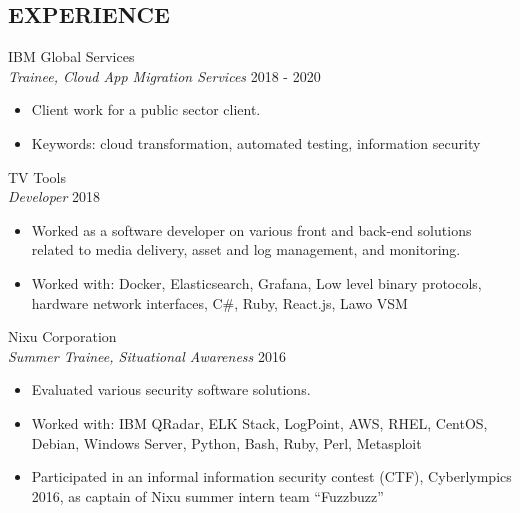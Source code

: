 \documentclass[margin, 10pt]{res} %
\begin{document}
\begin{resume}

%
%

 
\section{EXPERIENCE}
  
IBM Global Services\\
{\sl Trainee, Cloud App Migration Services} \hfill 2018 - 2020
\begin{itemize} \itemsep -2pt %
\item Client work for a public sector client.
\item Keywords: cloud transformation, automated testing, information security
\end{itemize}

\addvspace{-7pt}
TV Tools\\
{\sl Developer} \hfill 2018
\begin{itemize} \itemsep -2pt %
\item Worked as a software developer on various front and back-end solutions related to media delivery, asset and log management, and monitoring.
\item Worked with: Docker, Elasticsearch, Grafana, Low level binary protocols, hardware network interfaces, C\#, Ruby, React.js, Lawo VSM
\end{itemize}

\addvspace{-7pt}
Nixu Corporation\\
{\sl Summer Trainee, Situational Awareness} \hfill 2016
\begin{itemize} \itemsep -2pt %
\item Evaluated various security software solutions.
\item Worked with:  IBM QRadar, ELK Stack, LogPoint, AWS, RHEL, CentOS, Debian, Windows Server, Python, Bash, Ruby, Perl, Metasploit
\item Participated in an informal information security contest (CTF), Cyberlympics 2016, as captain of Nixu summer intern team ``Fuzzbuzz''  
\end{itemize}


\end{resume}
\end{document}
